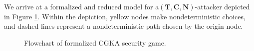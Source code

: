 We arrive at a formalized and reduced  model for a$( \textbf{T}, \textbf{C}, \textbf{N} )$-attacker depicted in Figure \ref{fig:CGKA-old-flowchart}.
Within the depiction, yellow nodes make nondeterministic choices, and dashed lines represent a nondeterministic path chosen by the origin node.
\begin{figure}
  \centering
  \caption{\label{fig:CGKA-old-flowchart}Flowchart of formalized CGKA security game.}
\end{figure}



